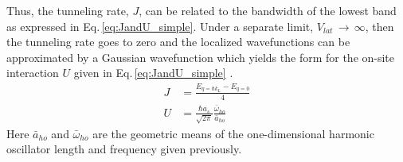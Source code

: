 Thus, the tunneling rate, $J$, can be related to the bandwidth of the lowest band as expressed in Eq.\,\ref{eq:JandU_simple}.
Under a separate limit, $V_{lat}\,\rightarrow\,\infty$, then the tunneling rate goes to zero and the localized wavefunctions can be approximated by a Gaussian wavefunction which yields the form for the on-site interaction $U$ given in Eq.\,\ref{eq:JandU_simple} \cite{Rey2004}.
	\begin{equation} \label{eq:JandU_simple}
	\begin{aligned}
		 J &= \frac{E_{q=\hbar k_L} - E_{q=0}}{4}\\
		 U &= \frac{\hbar a_s}{\sqrt{2 \pi}}\frac{\bar{\omega}_{ho}}{\bar{a}_{ho}}
	\end{aligned}
	\end{equation}
Here $\bar{a}_{ho}$ and $\bar{\omega}_{ho}$ are the geometric means of the one-dimensional harmonic oscillator length and frequency given previously.


